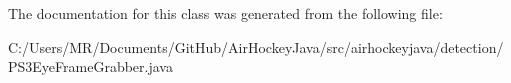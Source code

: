 The documentation for this class was generated from the following file\+:\begin{DoxyCompactItemize}
\item 
C\+:/\+Users/\+M\+R/\+Documents/\+Git\+Hub/\+Air\+Hockey\+Java/src/airhockeyjava/detection/P\+S3\+Eye\+Frame\+Grabber.\+java\end{DoxyCompactItemize}
